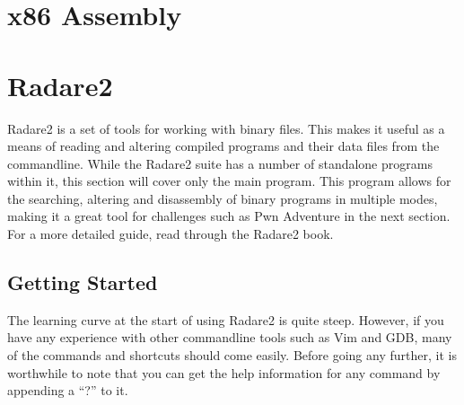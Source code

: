 \documentclass[a4paper,11pt]{report}
\begin{document}
	\section{x86 Assembly}
	\section{Radare2}
		Radare2 is a set of tools for working with binary files. 
		This makes it useful as a means of reading and altering compiled programs and their data files from the commandline. 
		While the Radare2 suite has a number of standalone programs within it, this section will cover only the main program. 
		This program allows for the searching, altering and disassembly of binary programs in multiple modes, making it a great tool for challenges such as Pwn Adventure in the next section.
		For a more detailed guide, read through the Radare2 book.\cite{Radare2}

		\subsection{Getting Started}
			The learning curve at the start of using Radare2 is quite steep. 
			However, if you have any experience with other commandline tools such as Vim and GDB, many of the commands and shortcuts should come easily. 
			Before going any further, it is worthwhile to note that you can get the help information for any command by appending a ``?'' to it. 
\end{document}
